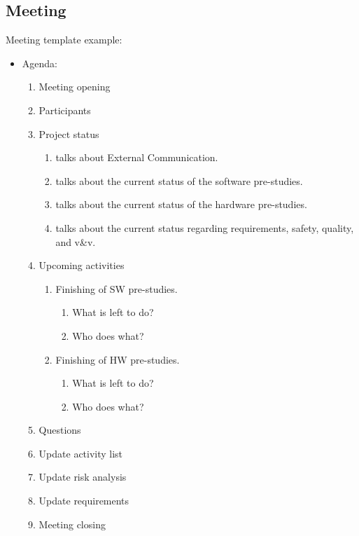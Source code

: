 \subsection*{Meeting}

    Meeting template example:
    
    \begin{itemize}
        \item[] Agenda:
        \begin{enumerate}
            \item Meeting opening
            \item Participants
            \item Project status
            \begin{enumerate}
                \item <project member> talks about External Communication.
                \item <project member> talks about the current status of the software pre-studies.
                \item <project member> talks about the current status of the hardware pre-studies.
                \item <project member> talks about the current status regarding requirements, safety, quality, and v\&v.
            \end{enumerate}
            \item Upcoming activities
            \begin{enumerate}
                \item Finishing of SW pre-studies.
                \begin{enumerate}
                    \item What is left to do?
                    \item Who does what?
                \end{enumerate}
                \item Finishing of HW pre-studies.
                \begin{enumerate}
                    \item What is left to do?
                    \item Who does what?
                \end{enumerate}
            \end{enumerate}
            \item Questions
            \item Update activity list
            \item Update risk analysis
            \item Update requirements
            \item Meeting closing
        \end{enumerate}
    \end{itemize}
